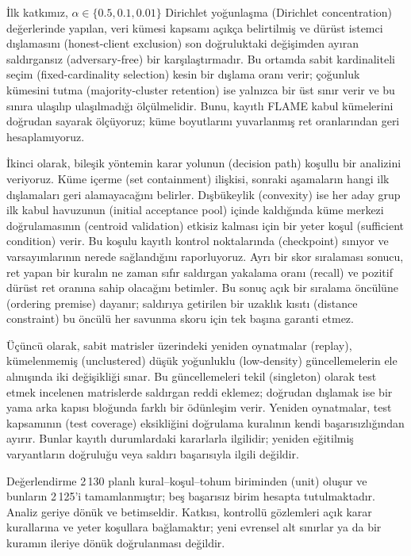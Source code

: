 \documentclass[journal]{IEEEtran}
\begin{document}
İlk katkımız, $\alpha\in\{0.5,0.1,0.01\}$ Dirichlet yoğunlaşma (Dirichlet concentration) değerlerinde yapılan, veri kümesi kapsamı açıkça belirtilmiş ve dürüst istemci dışlamasını (honest-client exclusion) son doğruluktaki değişimden ayıran saldırgansız (adversary-free) bir karşılaştırmadır. Bu ortamda sabit kardinaliteli seçim (fixed-cardinality selection) kesin bir dışlama oranı verir; çoğunluk kümesini tutma (majority-cluster retention) ise yalnızca bir üst sınır verir ve bu sınıra ulaşılıp ulaşılmadığı ölçülmelidir. Bunu, kayıtlı FLAME kabul kümelerini doğrudan sayarak ölçüyoruz; küme boyutlarını yuvarlanmış ret oranlarından geri hesaplamıyoruz.

İkinci olarak, bileşik yöntemin karar yolunun (decision path) koşullu bir analizini veriyoruz. Küme içerme (set containment) ilişkisi, sonraki aşamaların hangi ilk dışlamaları geri alamayacağını belirler. Dışbükeylik (convexity) ise her aday grup ilk kabul havuzunun (initial acceptance pool) içinde kaldığında küme merkezi doğrulamasının (centroid validation) etkisiz kalması için bir yeter koşul (sufficient condition) verir. Bu koşulu kayıtlı kontrol noktalarında (checkpoint) sınıyor ve varsayımlarının nerede sağlandığını raporluyoruz. Ayrı bir skor sıralaması sonucu, ret yapan bir kuralın ne zaman sıfır saldırgan yakalama oranı (recall) ve pozitif dürüst ret oranına sahip olacağını betimler. Bu sonuç açık bir sıralama öncülüne (ordering premise) dayanır; saldırıya getirilen bir uzaklık kısıtı (distance constraint) bu öncülü her savunma skoru için tek başına garanti etmez.

Üçüncü olarak, sabit matrisler üzerindeki yeniden oynatmalar (replay), kümelenmemiş (unclustered) düşük yoğunluklu (low-density) güncellemelerin ele alınışında iki değişikliği sınar. Bu güncellemeleri tekil (singleton) olarak test etmek incelenen matrislerde saldırgan reddi eklemez; doğrudan dışlamak ise bir yama arka kapısı bloğunda farklı bir ödünleşim verir. Yeniden oynatmalar, test kapsamının (test coverage) eksikliğini doğrulama kuralının kendi başarısızlığından ayırır. Bunlar kayıtlı durumlardaki kararlarla ilgilidir; yeniden eğitilmiş varyantların doğruluğu veya saldırı başarısıyla ilgili değildir.

Değerlendirme 2\,130 planlı kural--koşul--tohum biriminden (unit) oluşur ve bunların 2\,125'i tamamlanmıştır; beş başarısız birim hesapta tutulmaktadır. Analiz geriye dönük ve betimseldir. Katkısı, kontrollü gözlemleri açık karar kurallarına ve yeter koşullara bağlamaktır; yeni evrensel alt sınırlar ya da bir kuramın ileriye dönük doğrulanması değildir.
\end{document}
